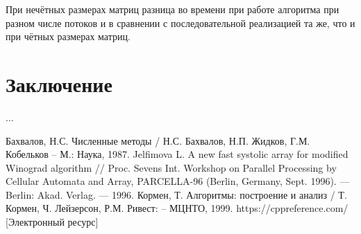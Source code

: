 \documentclass[12pt, a4paper]{report}
\begin{document}
 	При нечётных размерах матриц разница во времени при работе алгоритма при разном числе потоков и в сравнении с последовательной реализацией та же, что и при чётных размерах матриц.

	\chapter*{Заключение}
	...
	
	\newpage
	
	\begin{thebibliography}{}
	 Бахвалов, Н.С. Численные методы / Н.С. Бахвалов, Н.П. Жидков, Г.М. Кобельков – М.: Наука, 1987.
	 Jelfimova L. A new fast systolic array for modified Winograd algorithm // Proc. Sevens Int. Workshop on Parallel Processing by Cellular Automata and Array, PARCELLA-96 (Berlin, Germany, Sept. 1996). — Berlin: Akad. Verlag. — 1996.
	 Кормен, Т. Алгоритмы: построение и анализ / Т. Кормен, Ч. Лейзерсон, Р.М. Ривест: – МЦНТО, 1999.
	 https://cppreference.com/ [Электронный ресурс]
	\end{thebibliography}
\end{document}
